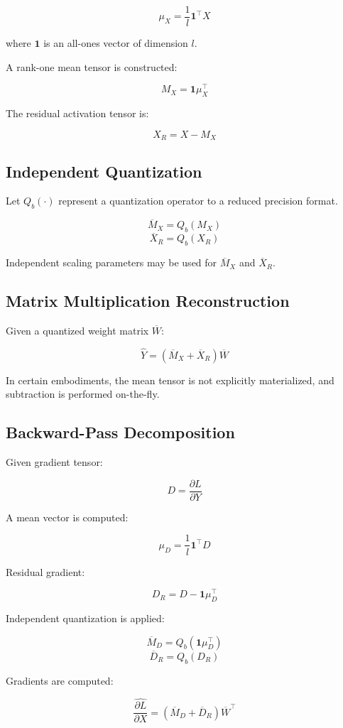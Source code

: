 \documentclass[12pt]{article}
\begin{document}
\[
\mu_X = \frac{1}{l} \bm{1}^\top X
\]

where $\bm{1}$ is an all-ones vector of dimension $l$.

A rank-one mean tensor is constructed:

\[
M_X = \bm{1} \mu_X^\top
\]

The residual activation tensor is:

\[
X_R = X - M_X
\]

\subsection{Independent Quantization}

Let $Q_b(\cdot)$ represent a quantization operator to a reduced precision format.

\[
\overline{M}_X = Q_b(M_X)
\]
\[
\overline{X}_R = Q_b(X_R)
\]

Independent scaling parameters may be used for $\overline{M}_X$ and $\overline{X}_R$.

\subsection{Matrix Multiplication Reconstruction}

Given a quantized weight matrix $\overline{W}$:

\[
\widehat{Y} = (\overline{M}_X + \overline{X}_R) \overline{W}
\]

In certain embodiments, the mean tensor is not explicitly materialized, and subtraction is performed on-the-fly.

\subsection{Backward-Pass Decomposition}

Given gradient tensor:

\[
D = \frac{\partial L}{\partial Y}
\]

A mean vector is computed:

\[
\mu_D = \frac{1}{l} \bm{1}^\top D
\]

Residual gradient:

\[
D_R = D - \bm{1}\mu_D^\top
\]

Independent quantization is applied:

\[
\overline{M}_D = Q_b(\bm{1}\mu_D^\top)
\]
\[
\overline{D}_R = Q_b(D_R)
\]

Gradients are computed:

\[
\widehat{\frac{\partial L}{\partial X}} = (\overline{M}_D + \overline{D}_R) \overline{W}^\top
\]
\end{document}
